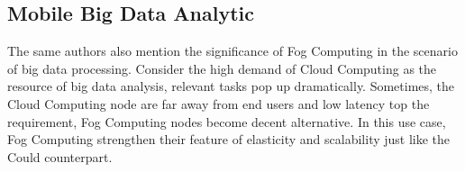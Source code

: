 \subsection{Mobile Big Data Analytic}
The same authors also mention the significance of Fog Computing in the scenario of big data processing. Consider the high demand of Cloud Computing as the resource of big data analysis, relevant tasks pop up dramatically. Sometimes, the Cloud Computing node are far away from end users and low latency top the requirement, Fog Computing nodes become decent alternative. In this use case, Fog Computing strengthen their feature of elasticity and scalability just like the Could counterpart.